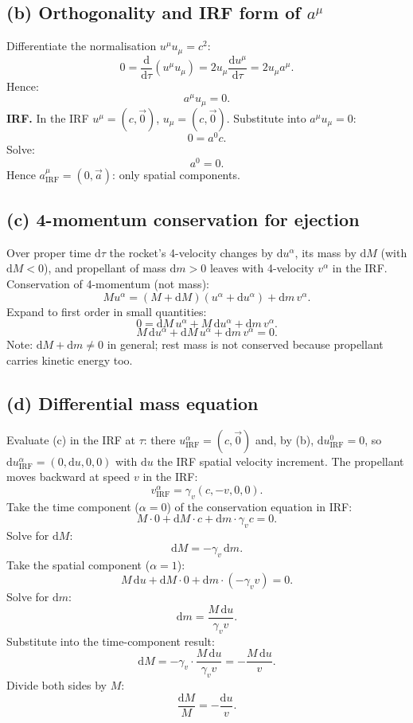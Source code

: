 \documentclass[11pt]{article}
\newcommand{\de}{\mathrm{d}}
\begin{document}
\subsection*{(b) Orthogonality and IRF form of $a^{\mu}$}

Differentiate the normalisation $u^{\mu}u_{\mu}=c^{2}$:
\[ 0=\frac{\de}{\de\tau}(u^{\mu}u_{\mu})=2u_{\mu}\frac{\de u^{\mu}}{\de\tau}=2u_{\mu}a^{\mu}. \]
Hence:
\begin{equation}
\boxed{\;a^{\mu}u_{\mu}=0.\;}
\end{equation}
\textbf{IRF.} In the IRF $u^{\mu}=(c,\vec 0)$, $u_{\mu}=(c,\vec 0)$. Substitute into $a^{\mu}u_{\mu}=0$:
\[ 0=a^{0}c. \]
Solve:
\[ a^{0}=0. \]
Hence $a^{\mu}_{\text{IRF}}=(0,\vec a)$: only spatial components.

\subsection*{(c) 4-momentum conservation for ejection}

Over proper time $\de\tau$ the rocket's 4-velocity changes by $\de u^{\alpha}$, its mass by $\de M$ (with $\de M<0$), and propellant of mass $\de m>0$ leaves with 4-velocity $v^{\alpha}$ in the IRF. Conservation of 4-momentum (not mass):
\[ Mu^{\alpha}=(M+\de M)(u^{\alpha}+\de u^{\alpha})+\de m\,v^{\alpha}. \]
Expand to first order in small quantities:
\[ 0=\de M\,u^{\alpha}+M\,\de u^{\alpha}+\de m\,v^{\alpha}. \]
\begin{equation}
\boxed{\;M\,\de u^{\alpha}+\de M\,u^{\alpha}+\de m\,v^{\alpha}=0.\;}
\end{equation}
Note: $\de M+\de m\neq 0$ in general; rest mass is not conserved because propellant carries kinetic energy too.

\subsection*{(d) Differential mass equation}

Evaluate (c) in the IRF at $\tau$: there $u^{\alpha}_{\text{IRF}}=(c,\vec 0)$ and, by (b), $\de u^{0}_{\text{IRF}}=0$, so $\de u^{\alpha}_{\text{IRF}}=(0,\de u,0,0)$ with $\de u$ the IRF spatial velocity increment. The propellant moves backward at speed $v$ in the IRF:
\[ v^{\alpha}_{\text{IRF}}=\gamma_{v}(c,-v,0,0). \]
Take the time component ($\alpha=0$) of the conservation equation in IRF:
\[ M\cdot 0+\de M\cdot c+\de m\cdot\gamma_{v}c=0. \]
Solve for $\de M$:
\[ \de M=-\gamma_{v}\,\de m. \]
Take the spatial component ($\alpha=1$):
\[ M\,\de u+\de M\cdot 0+\de m\cdot(-\gamma_{v}v)=0. \]
Solve for $\de m$:
\[ \de m=\frac{M\,\de u}{\gamma_{v}v}. \]
Substitute into the time-component result:
\[ \de M=-\gamma_{v}\cdot\frac{M\,\de u}{\gamma_{v}v}=-\frac{M\,\de u}{v}. \]
Divide both sides by $M$:
\begin{equation}
\boxed{\;\frac{\de M}{M}=-\frac{\de u}{v}.\;}
\end{equation}
\end{document}
